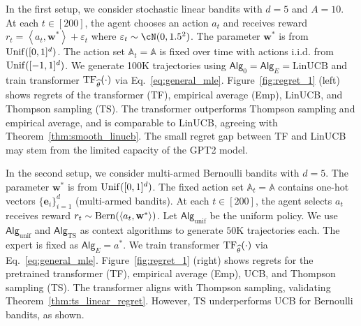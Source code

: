 \documentclass[10pt]{article}
\newcommand{\eps}{\varepsilon}
\newcommand{\<}{\left\langle}
\renewcommand{\>}{\right\rangle}
\newcommand{\TF}{{\rm TF}}
\newcommand{\LinUCB}{{\mathrm{LinUCB}}}
\newcommand{\TS}{{\mathrm{TS}}}
\newcommand{\action}{{a}}
\newcommand{\reward}{{r}}
\newcommand{\sAlg}{{\mathsf{Alg}}}
\newcommand{\EstPar}{{\widehat{\theta}}}
\newcommand{\shortexp}{{E}}
\def\sA{{\mathbb{A}}}
\def\be{{\mathbf e}}
\def\bw{{\mathbf w}}
\begin{document}
In the first setup, we consider stochastic linear bandits with $d=5$ and $A=10$. At each $t \in [200]$, the agent chooses an action $\action_t$ and receives reward $\reward_t=\<\action_t,\bw^*\>+\eps_t$ where $\eps_t\sim\cN(0,1.5^2)$. The parameter $\bw^*$ is from ${\rm Unif}([0,1]^d)$. The action set $\sA_t=\sA$ is fixed over time with actions i.i.d. from ${\rm Unif}([-1, 1]^d)$. We generate 100K trajectories using $\sAlg_0=\sAlg_{\shortexp}=\LinUCB$ and train transformer $\TF_\EstPar(\cdot)$ via Eq.~\eqref{eq:general_mle}. Figure~\ref{fig:regret_1} (left) shows regrets of the transformer (TF), empirical average (Emp), LinUCB, and Thompson sampling (TS). The transformer outperforms Thompson sampling and empirical average, and is comparable to LinUCB, agreeing with Theorem~\ref{thm:smooth_linucb}. The small regret gap between TF and LinUCB may stem from the limited capacity of the GPT2 model.





In the second setup, we consider multi-armed Bernoulli bandits with $d = 5$. The parameter $\bw^*$ is from ${\rm Unif}([0,1]^d)$. The fixed action set $\sA_t=\sA$ contains one-hot vectors $\{\be_i\}_{i=1}^d$ (multi-armed bandits). At each $t \in [200]$, the agent selects $\action_t$ receives reward $r_t \sim {\rm Bern}(\<\action_t,\bw^*\>)$. Let $\sAlg_{\mathrm{unif}}$ be the uniform policy. We use $\sAlg_{\mathrm{unif}}$ and $\sAlg_\TS$ as context algorithms to generate $50$K trajectories each. The expert is fixed as $\sAlg_\shortexp=\action^*$. We train transformer $\TF_\EstPar(\cdot)$ via Eq.~\eqref{eq:general_mle}. Figure~\ref{fig:regret_1} (right) shows regrets for the pretrained transformer (TF), empirical average (Emp), UCB, and Thompson sampling (TS).  The transformer aligns with Thompson sampling, validating Theorem~\ref{thm:ts_linear_regret}. However, TS underperforms UCB for Bernoulli bandits, as shown.
\end{document}
